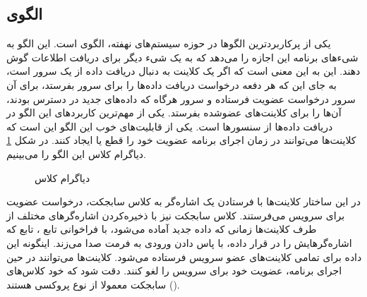 \subsection{الگوی }
\label{HWObserverSec}
\begin{RTL}
یکی از پرکاربردترین الگوها در حوزه سیستم‌های نهفته، الگوی  است.
این الگو به شیء‌های برنامه این اجازه را می‌دهد که به یک شی‌ء دیگر برای دریافت
اطلاعات گوش دهند. این به این معنی است که اگر یک کلاینت به دنبال دریافت
داده از یک سرور است، به جای این که هر دفعه درخواست دریافت داده‌ها را برای
سرور بفرستد، برای آن سرور درخواست عضویت فرستاده و سرور هرگاه که داده‌های جدید
در دسترس بودند، آن‌ها را برای کلاینت‌های عضوشده بفرستد. یکی از مهم‌ترین کاربردهای
این الگو در دریافت داده‌ها از سنسورها است.
یکی از قابلیت‌های خوب این الگو این است که کلاینت‌ها می‌توانند در زمان اجرای برنامه
عضویت خود را قطع یا ایجاد کنند. در شکل \ref{HWObserverClassDiag}
دیاگرام کلاس این الگو را می‌بینیم.
\end{RTL}
\begin{figure}[h!]
\centering
{}
\caption{دیاگرام کلاس }
\label{HWObserverClassDiag}
\end{figure}
\begin{RTL}
در این ساختار کلاینت‌ها با فرستادن یک اشاره‌گر به کلاس سابجکت، درخواست عضویت برای 
سرویس می‌فرستند. کلاس سابجکت نیز با ذخیره‌کردن اشاره‌گرهای مختلف از طرف کلاینت‌ها
زمانی که داده جدید آماده می‌شود، با فراخوانی تابع ، تابع 
که اشاره‌گرهایش را در  قرار داده، با پاس دادن
ورودی به فرمت  صدا می‌زند. اینگونه این داده برای تمامی کلاینت‌های
عضو سرویس فرستاده می‌شود.
کلاینت‌ها می‌توانند در حین اجرای برنامه، عضویت خود برای سرویس را لغو کنند.
دقت شود که خود کلاس‌‌های سابجکت
معمولا از نوع پروکسی هستند ().
\end{RTL}